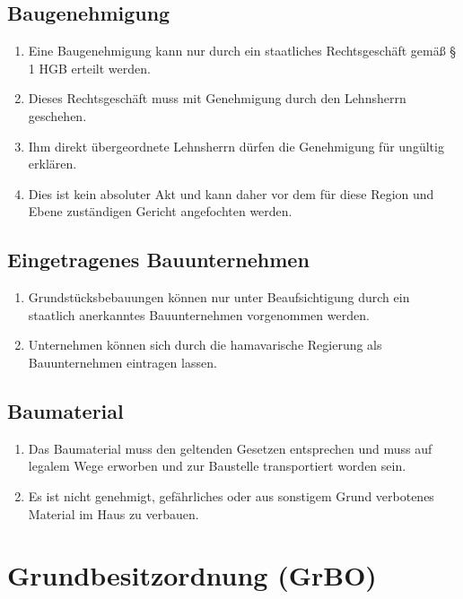 \documentclass{article}
\begin{document}
\subsection{Baugenehmigung} \label{baugen}
\begin{enumerate}[(1)]
    \item Eine Baugenehmigung kann nur durch ein staatliches Rechtsgeschäft gemäß § 1 HGB erteilt werden.
    \item Dieses Rechtsgeschäft muss mit Genehmigung durch den Lehnsherrn geschehen.
    \item Ihm direkt übergeordnete Lehnsherrn dürfen die Genehmigung für ungültig erklären.
    \item Dies ist kein absoluter Akt und kann daher vor dem für diese Region und Ebene zuständigen Gericht angefochten werden.
\end{enumerate}

\subsection{Eingetragenes Bauunternehmen} \label{bauunt}
\begin{enumerate}[(1)]
    \item Grundstücksbebauungen können nur unter Beaufsichtigung durch ein staatlich anerkanntes Bauunternehmen vorgenommen werden.
    \item Unternehmen können sich durch die hamavarische Regierung als Bauunternehmen eintragen lassen.
\end{enumerate}

\subsection{Baumaterial}
\begin{enumerate}[(1)]
    \item Das Baumaterial muss den geltenden Gesetzen entsprechen und muss auf legalem Wege erworben und zur Baustelle transportiert worden sein.
    \item Es ist nicht genehmigt, gefährliches oder aus sonstigem Grund verbotenes Material im Haus zu verbauen.
\end{enumerate}
\newpage
\section{Grundbesitzordnung (GrBO)}
\localtableofcontents
\end{document}
